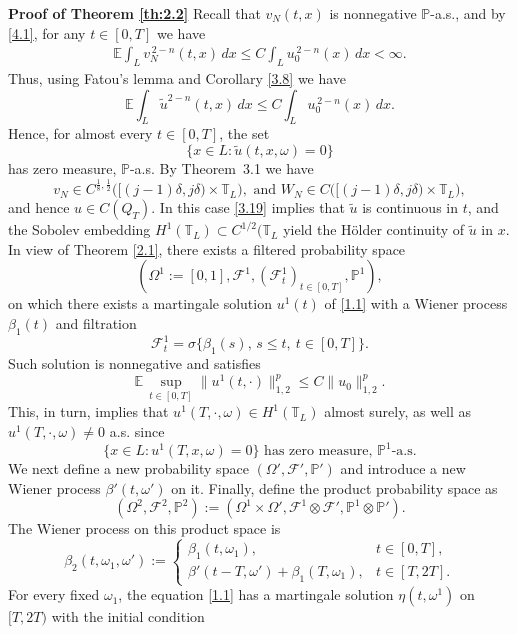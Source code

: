 \documentclass[a4paper,12pt]{article}
\numberwithin{equation}{section}
\def\tu{\tilde{u}}
\def\T{\mathbb{T}_L}
\begin{document}
\medskip
\noindent
\textbf{Proof of Theorem \ref{th:2.2}}
Recall that $v_N(t,x)$ is nonnegative $\mathbb P$-a.s., and by
\eqref{4.1}, for any $t\in[0,T]$ we have
\begin{align*}
\mathbb{E}\int_{L} v_N^{\,2-n}(t,x)\,dx
\le
C \int_{L} u_0^{\,2-n}(x)\,dx
< \infty.
\end{align*}
Thus, using Fatou's lemma and Corollary \ref{3.8} we have
\begin{equation}
\mathbb{E}\int_L \tilde{u}^{2-n}(t,x)\,dx
\le
C \int_L u_0^{\,2-n}(x)\,dx .
\label{4.2}
\end{equation}
Hence, for almost every $t \in [0,T]$, the set
\[
\{ x \in L : \tu(t,x,\omega) = 0 \}
\]
has zero measure, $\mathbb{P}$-a.s. By Theorem~3.1 we have
\[
v_N \in C^{\frac18, \frac12}\bigl([(j-1)\delta,j\delta) \times \T\bigr), \text{ and }
W_N \in C\bigl([(j-1)\delta,j\delta) \times \T\bigr),
\]
and hence $u \in C(Q_T).$ In this case \eqref{3.19} implies that $\tu$ is continuous in $t$, and the Sobolev embedding $H^1(\T) \subset C^{1/2}(\mathbb{T}_L$ yield the Hölder continuity of $\tu$  in  $x$. In view of Theorem \ref{2.1}, there exists a filtered probability space
\[
(\Omega^1:=[0,1], \mathcal{F}^1, (\mathcal{F}^1_t)_{t\in[0,T]}, \mathbb{P}^1),
\]
on which there exists a martingale solution $u^1(t)$ of \eqref{1.1}
with a Wiener process $\beta_1(t)$ and filtration
\[
\mathcal{F}^1_t = \sigma\{\beta_1(s),\, s\le t,\ t\in[0,T]\}.
\]
Such solution is nonnegative and satisfies
\[
\mathbb{E}\, \sup_{t\in[0,T]}
\|u^1(t,\cdot)\|_{1,2}^p
\le
C \|u_0\|_{1,2}^p.
\]
This, in turn, implies that $u^1(T, \cdot, \omega) \in H^1(\T)$ almost surely, as well as $u^1(T, \cdot, \omega) \neq 0$ a.s. since 
\[
\{x \in L : u^1(T,x,\omega)=0\}
\text{ has zero measure, } \mathbb{P}^1\text{-a.s.}
\]
We next define a new probability space
$(\Omega', \mathcal{F}', \mathbb{P}')$
and introduce a new Wiener process $\beta'(t,\omega')$ on it.
Finally, define the product probability space as
\[
(\Omega^2, \mathcal{F}^2, \mathbb{P}^2)
:=
(\Omega^1 \times \Omega',
 \mathcal{F}^1 \otimes \mathcal{F}',
 \mathbb{P}^1 \otimes \mathbb{P}').
\]
The Wiener process on this product space is
\[
\beta_2(t,\omega_1,\omega')
:=
\begin{cases}
\beta_1(t,\omega_1), & t \in [0,T], \\[6pt]
\beta'(t-T,\omega') + \beta_1(T,\omega_1),
& t \in [T,2T].
\end{cases}
\]
For every fixed $\omega_1$, the equation \eqref{1.1}  
has a martingale solution $\eta(t,\omega^1)$ on $[T,2T)$ with the initial condition
\end{document}
